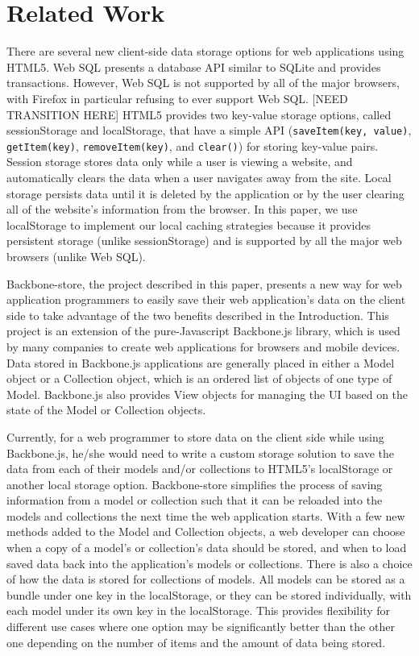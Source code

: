 \documentclass[12pt]{article}
\begin{document}
\section{Related Work}

There are several new client-side data storage options for web applications
using HTML5. Web SQL presents a database API similar to SQLite and provides
transactions. However, Web SQL is not supported by all of the major browsers,
with Firefox in particular refusing to ever support Web SQL. [NEED TRANSITION HERE] HTML5 provides two key-value storage options, called sessionStorage and localStorage, that have a simple API (\verb=saveItem(key, value)=, \verb=getItem(key)=,
\verb=removeItem(key)=, and \verb=clear()=) for storing key-value pairs.
Session storage stores data only while a user is viewing a website, and
automatically clears the data when a user navigates away from the site. Local
storage persists data until it is deleted by the application or by the user
clearing all of the website's information from the browser. In this paper, we use localStorage to implement our local caching strategies because it provides persistent storage (unlike sessionStorage) and is supported by all the major web browsers (unlike Web SQL). 

Backbone-store, the project described in this paper, presents a new way for web
application programmers to easily save their web application's data on the
client side to take advantage of the two benefits described in the Introduction. This project is
an extension of the pure-Javascript Backbone.js \cite{backbone} library, which is used by many
companies to create web applications for browsers and mobile devices. Data
stored in Backbone.js applications are generally placed in either a Model
object or a Collection object, which is an ordered list of objects of one type
of Model. Backbone.js also provides View objects for managing the UI based on
the state of the Model or Collection objects.

Currently, for a web programmer to store data on the client side while using
Backbone.js, he/she would need to write a custom storage solution to save the
data from each of their models and/or collections to HTML5's localStorage or
another local storage option. Backbone-store simplifies the process of saving
information from a model or collection such that it can be reloaded into the
models and collections the next time the web application starts. With a few new
methods added to the Model and Collection objects, a web developer can choose
when a copy of a model's or collection's data should be stored, and when to
load saved data back into the application's models or collections. There is
also a choice of how the data is stored for collections of models. All models
can be stored as a bundle under one key in the localStorage, or they can be
stored individually, with each model under its own key in the localStorage.
This provides flexibility for different use cases where one option may be
significantly better than the other one depending on the number of items and
the amount of data being stored.
\end{document}
